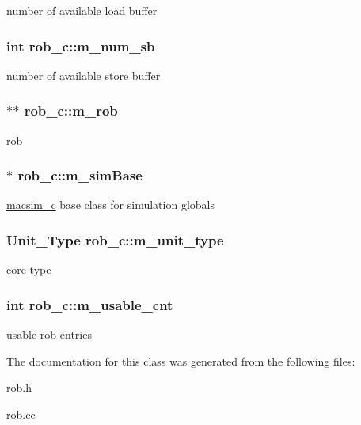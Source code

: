 number of available load buffer \hypertarget{classrob__c_acef1013b52096eaf28dff1108533590a}{
\subsubsection[{m\_\-num\_\-sb}]{\setlength{\rightskip}{0pt plus 5cm}int {\bf rob\_\-c::m\_\-num\_\-sb}}}
\label{classrob__c_acef1013b52096eaf28dff1108533590a}
number of available store buffer \hypertarget{classrob__c_a91eb948dd7fad415fa924e077e2e507a}{
\subsubsection[{m\_\-rob}]{$\ast$$\ast$ {\bf rob\_\-c::m\_\-rob}}}
\label{classrob__c_a91eb948dd7fad415fa924e077e2e507a}
rob \hypertarget{classrob__c_add617f927c196857b7bdd71e2cf11e75}{
\subsubsection[{m\_\-simBase}]{$\ast$ {\bf rob\_\-c::m\_\-simBase}}}
\label{classrob__c_add617f927c196857b7bdd71e2cf11e75}
\hyperlink{classmacsim__c}{macsim\_\-c} base class for simulation globals \hypertarget{classrob__c_ac7c7d51958a975d0c6e19abab9c758ed}{
\subsubsection[{m\_\-unit\_\-type}]{\setlength{\rightskip}{0pt plus 5cm}Unit\_\-Type {\bf rob\_\-c::m\_\-unit\_\-type}}}
\label{classrob__c_ac7c7d51958a975d0c6e19abab9c758ed}
core type \hypertarget{classrob__c_a01a33ab695e5fdcec8c271d7f7a9758b}{
\subsubsection[{m\_\-usable\_\-cnt}]{\setlength{\rightskip}{0pt plus 5cm}int {\bf rob\_\-c::m\_\-usable\_\-cnt}}}
\label{classrob__c_a01a33ab695e5fdcec8c271d7f7a9758b}
usable rob entries 

The documentation for this class was generated from the following files:\begin{DoxyCompactItemize}
\item 
rob.h\item 
rob.cc\end{DoxyCompactItemize}
